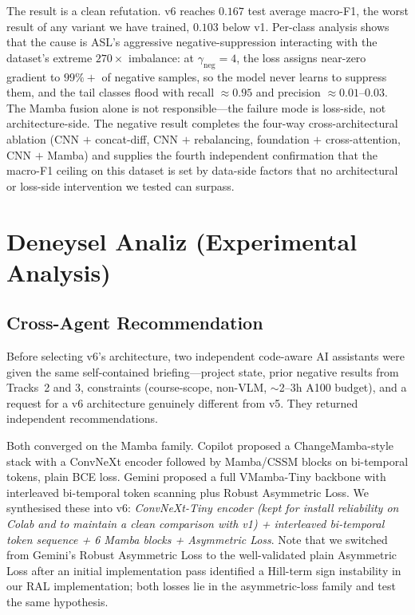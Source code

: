 \documentclass[journal]{IEEEtran}
\begin{document}
The result is a clean refutation. v6 reaches $0.167$ test average macro-F1, the worst result of any variant we have trained, $0.103$ below v1. Per-class analysis shows that the cause is ASL's aggressive negative-suppression interacting with the dataset's extreme $270{\times}$ imbalance: at $\gamma_\mathrm{neg}{=}4$, the loss assigns near-zero gradient to $99\%{+}$ of negative samples, so the model never learns to suppress them, and the tail classes flood with recall $\approx 0.95$ and precision $\approx 0.01$--$0.03$. The Mamba fusion alone is not responsible---the failure mode is loss-side, not architecture-side. The negative result completes the four-way cross-architectural ablation (CNN $+$ concat-diff, CNN $+$ rebalancing, foundation $+$ cross-attention, CNN $+$ Mamba) and supplies the fourth independent confirmation that the macro-F1 ceiling on this dataset is set by data-side factors that no architectural or loss-side intervention we tested can surpass.

\section{Deneysel Analiz (Experimental Analysis)}\label{sec:deneyselanaliz}

\subsection{Cross-Agent Recommendation}\label{ssec:cross-agent}

Before selecting v6's architecture, two independent code-aware AI assistants were given the same self-contained briefing---project state, prior negative results from Tracks~2 and 3, constraints (course-scope, non-VLM, $\sim$2--3h A100 budget), and a request for a v6 architecture genuinely different from v5. They returned independent recommendations.

Both converged on the Mamba family. Copilot proposed a ChangeMamba-style stack with a ConvNeXt encoder followed by Mamba/CSSM blocks on bi-temporal tokens, plain BCE loss. Gemini proposed a full VMamba-Tiny backbone with interleaved bi-temporal token scanning plus Robust Asymmetric Loss. We synthesised these into v6: \emph{ConvNeXt-Tiny encoder (kept for install reliability on Colab and to maintain a clean comparison with v1) + interleaved bi-temporal token sequence + 6 Mamba blocks + Asymmetric Loss}. Note that we switched from Gemini's Robust Asymmetric Loss to the well-validated plain Asymmetric Loss after an initial implementation pass identified a Hill-term sign instability in our RAL implementation; both losses lie in the asymmetric-loss family and test the same hypothesis.
\end{document}
